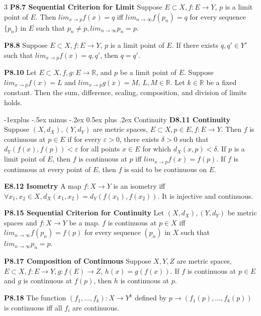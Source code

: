 \documentclass[10pt, landscape]{article}
\makeatletter
\renewcommand{\section}{\@startsection{section}{1}{0mm}%
                                {-1ex plus -.5ex minus -.2ex}%
                                {0.5ex plus .2ex}%
                                {\normalfont\large\bfseries}}
\renewcommand{\section}{\@startsection{section}{2}{0mm}%
                                {-1explus -.5ex minus -.2ex}%
                                {0.5ex plus .2ex}%
                                {\normalfont\normalsize\bfseries}}
\makeatother
\begin{document}
\begin{multicols*}{3}
\textbf{P8.7 Sequential Criterion for Limit} Suppose $E \subset X, f: E \rightarrow Y$, $p$ is a limit point of $E$. Then $lim_{x\rightarrow p}f(x)=q$ iff $lim_{n\rightarrow\infty}f(p_n)=q$ for every sequence $\{p_n\}$ in $E$ such that $p_n \neq p, lim_{n\rightarrow\infty}p_n=p$.

\textbf{P8.8} Suppose $E \subset X, f:E \rightarrow Y$, $p$ is a limit point of $E$. If there exists $q, q' \in Y'$ such that $lim_{x\rightarrow p}f(x)= q, q'$, then $q=q'$.

\textbf{P8.10} Let $E \subset X, f, g: E \rightarrow \mathbb{R}$, and $p$ be a limit point of $E$. Suppose $lim_{x \rightarrow p}f(x)=L$ and $lim_{x\rightarrow p}g(x)=M$, $L, M \in \mathbb{R}$. Let $k \in \mathbb{R}$ be a fixed constant. Then the sum, difference, scaling, composition, and division of limits holds.

\section{Continuity}
\textbf{D8.11 Continuity} Suppose $(X, d_X), (Y, d_Y)$ are metric spaces, $E \subset X, p \in E, f: E \rightarrow Y$. Then $f$ is continuous at $p \in E$ if for every $\varepsilon > 0$, there exists $\delta > 0$ such that $d_Y(f(x), f(p)) < \varepsilon$ for all points $x \in E$ for which $d_X(x, p) < \delta$. If $p$ is a limit point of $E$, then $f$ is continuous at $p$ iff $lim_{x \rightarrow p }f(x)=f(p)$. If $f$ is continuous at every point of $E$, then $f$ is said to be continuous on $E$.

\textbf{E8.12 Isometry} A map $f:X\rightarrow Y$ is an isometry iff $\forall x_1, x_2 \in X, d_X(x_1, x_2) = d_Y(f(x_1), f(x_2))$. It is injective and continuous.

\textbf{P8.15 Sequential Criterion for Continuity} Let $(X, d_X), (Y, d_Y)$ be metric spaces and $f: X \rightarrow Y$ be a map. $f$ is continuous at $p \in X$ iff $lim_{n \rightarrow\infty} f(p_n)=f(p)$ for every sequence $(p_n)$ in $X$ such that $lim_{n\rightarrow\infty}p_n=p$.

\textbf{P8.17 Composition of Continuous} Suppose $X,Y,Z$ are metric spaces, $E\subset X, f:E \rightarrow Y, g: f(E) \rightarrow Z$, $h(x)=g(f(x))$. If $f$ is continuous at $p \in E$ and $g$ is continuous at $f(p)$, then $h$ is continuous at $p$.

\textbf{P8.18} The function $(f_1,...,f_k): X \rightarrow Y^k$ defined by $p \rightarrow (f_1(p),...,f_k(p))$ is continuous iff all $f_i$ are continuous.


\end{multicols*}
\end{document}
